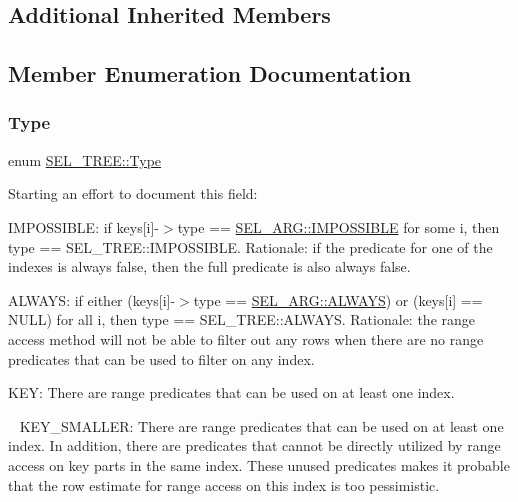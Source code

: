 \subsection*{Additional Inherited Members}


\subsection{Member Enumeration Documentation}
\mbox{\label{classSEL__TREE_ab2c33faad20fa0700f23ed800de66cc8}} 
\subsubsection{\texorpdfstring{Type}{Type}}
{\footnotesize\ttfamily enum \mbox{\hyperlink{classSEL__TREE_ab2c33faad20fa0700f23ed800de66cc8}{S\+E\+L\+\_\+\+T\+R\+E\+E\+::\+Type}}}

Starting an effort to document this field\+:

I\+M\+P\+O\+S\+S\+I\+B\+LE\+: if keys\mbox{[}i\mbox{]}-\/$>$type == \mbox{\hyperlink{classSEL__ARG_ac3c2b193f810aece693ca18c6a1a9312ad50f65fbe3c63291a0d83af61a7def3b}{S\+E\+L\+\_\+\+A\+R\+G\+::\+I\+M\+P\+O\+S\+S\+I\+B\+LE}} for some i, then type == S\+E\+L\+\_\+\+T\+R\+E\+E\+::\+I\+M\+P\+O\+S\+S\+I\+B\+LE. Rationale\+: if the predicate for one of the indexes is always false, then the full predicate is also always false.

A\+L\+W\+A\+YS\+: if either (keys\mbox{[}i\mbox{]}-\/$>$type == \mbox{\hyperlink{classSEL__ARG_ac3c2b193f810aece693ca18c6a1a9312aa4c879a3200c2e2937c190083e0df32f}{S\+E\+L\+\_\+\+A\+R\+G\+::\+A\+L\+W\+A\+YS}}) or (keys\mbox{[}i\mbox{]} == N\+U\+LL) for all i, then type == S\+E\+L\+\_\+\+T\+R\+E\+E\+::\+A\+L\+W\+A\+YS. Rationale\+: the range access method will not be able to filter out any rows when there are no range predicates that can be used to filter on any index.

K\+EY\+: There are range predicates that can be used on at least one index.

~\newline
K\+E\+Y\+\_\+\+S\+M\+A\+L\+L\+ER\+: There are range predicates that can be used on at least one index. In addition, there are predicates that cannot be directly utilized by range access on key parts in the same index. These unused predicates makes it probable that the row estimate for range access on this index is too pessimistic. 


